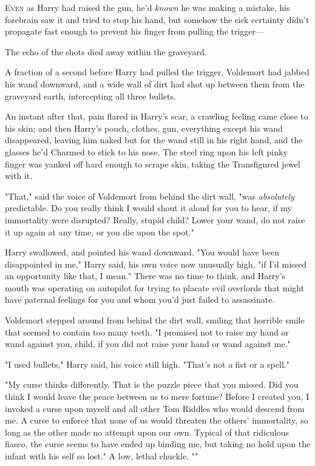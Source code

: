 
\lettrine{E}{ven} as Harry had
raised the gun, he'd \emph{known} he was making a mistake, his forebrain saw it
and tried to stop his hand, but somehow the sick certainty didn't propagate
fast enough to prevent his finger from pulling the trigger---

The echo of the shots died away within the graveyard.

A fraction of a second before Harry had pulled the trigger, Voldemort had
jabbed his wand downward, and a wide wall of dirt had shot up between them from
the graveyard earth, intercepting all three bullets.

An instant after that, pain flared in Harry's scar, a crawling feeling came
close to his skin; and then Harry's pouch, clothes, gun, everything except his
wand disappeared, leaving him naked but for the wand still in his right hand,
and the glasses he'd Charmed to stick to his nose. The steel ring upon his left
pinky finger was yanked off hard enough to scrape skin, taking the Transfigured
jewel with it.

"That," said the voice of Voldemort from behind the dirt wall, "was
\emph{absolutely} predictable. Do you really think I would shout it aloud for
you to hear, if my immortality were disrupted? Really, stupid child? Lower your
wand, do not raise it up again at any time, or you die upon the spot."

Harry swallowed, and pointed his wand downward. "You would have been
disappointed in me," Harry said, his own voice now unusually high, "if I'd
missed an opportunity like that, I mean." There was no time to think, and
Harry's mouth was operating on autopilot for trying to placate evil overlords
that might have paternal feelings for you and whom you'd just failed to
assassinate.

Voldemort stepped around from behind the dirt wall, smiling that horrible smile
that seemed to contain too many teeth. "I promised not to raise my hand or wand
against you, child, if you did not raise your hand or wand against me."

"I used bullets," Harry said, his voice still high. "That's not a fist or a
spell."

"My curse thinks differently. That is the puzzle piece that you missed. Did you
think I would leave the peace between us to mere fortune? Before I created you,
I invoked a curse upon myself and all other Tom Riddles who would descend from
me. A curse to enforce that none of us would threaten the others' immortality,
so long as the other made no attempt upon our own. Typical of that ridiculous
fiasco, the curse seems to have ended up binding me, but taking no hold upon
the infant with his self so lost." A low, lethal chuckle. ""

